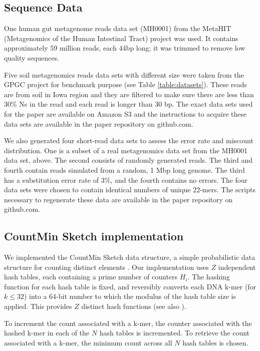 \documentclass[10pt]{article}
\begin{document}
\subsection*{Sequence Data}

One human gut metagenome reads data set (MH0001) from the 
MetaHIT (Metagenomics of the Human Intestinal Tract) project \cite{Qin2010} was used. 
It contains approximately 59 million reads, each 44bp long; it was trimmed to remove 
low quality sequences. 

Five soil metagenomics reads data sets with different size were taken
from the GPGC project for benchmark purpose (see Table
\ref{table:datasets}).  These reads are from soil in Iowa region and they
are filtered to make sure there are less than 30\% Ns in the read and
each read is longer than 30 bp.  The exact data sets used for the
paper are available on Amazon S3 and the instructions to acquire these
data sets are available in the paper repository on github.com.

We also generated four short-read data sets to assess the error
rate and miscount distribution. One is a subset of a real
metagenomics data set from the MH0001 data set, above. The second
consists of randomly generated reads. The third and fourth contain
reads simulated from a random, 1 Mbp long genome.  The third has a
substitution error rate of 3\%, and the fourth contains no errors. The
four data sets were chosen to contain identical numbers of unique
22-mers.  The scripts necessary to regenerate these data are available
in the paper repository on github.com.

\subsection*{CountMin Sketch implementation}

We implemented the CountMin Sketch data structure, a simple
probabilistic data structure for counting distinct elements
\cite{Cormode2005}.  Our implementation uses $Z$ independent hash
tables, each containing a prime number of counters $H_i$.  The hashing
function for each hash table is fixed, and reversibly converts each
DNA k-mer (for $k \le 32$) into a 64-bit number to which the modulus of
the hash table size is applied.  This provides $Z$ distinct hash
functions (see also \cite{adina2013}).

To increment the count associated with a k-mer, the counter associated
with the hashed k-mer in each of the $N$ hash tables is incremented.
To retrieve the count associated with a k-mer, the minimum count
across all $N$ hash tables is chosen.
\end{document}
